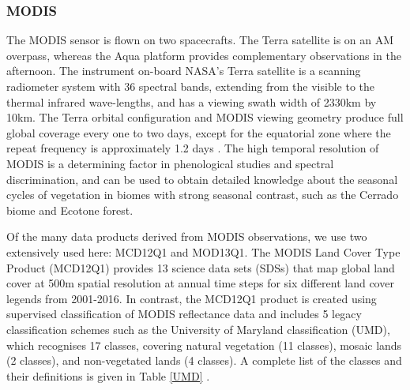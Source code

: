 \subsubsection{MODIS}


The MODIS sensor is flown on two spacecrafts. The Terra satellite is on an AM overpass, whereas the Aqua platform provides complementary observations in the afternoon. The instrument on-board NASA’s Terra satellite is a scanning radiometer system with 36 spectral bands, extending from the visible to the thermal infrared wave-lengths, and has a viewing swath width of 2330km by 10km. The Terra orbital configuration and MODIS viewing geometry produce full global coverage every one to two days, except for the equatorial zone where the repeat frequency is approximately 1.2 days \citep{zhan_2002, setiawan_2014}. The high temporal resolution of MODIS is a determining factor in phenological studies and spectral discrimination, and can be used to obtain detailed knowledge about the seasonal cycles of vegetation in biomes with strong seasonal contrast, such as the Cerrado biome and Ecotone forest. 




Of the many data products derived from MODIS observations, we use two extensively used here: MCD12Q1 and MOD13Q1. The MODIS Land Cover Type Product (MCD12Q1) provides 13 science data sets (SDSs) that map global land cover at 500m spatial resolution at annual time steps for six different land cover legends from 2001-2016. In contrast, the MCD12Q1 product is created using supervised classification of MODIS reflectance data and includes 5 legacy classification schemes such as the University of Maryland classification (UMD), which recognises 17 classes, covering natural vegetation (11 classes), mosaic lands (2 classes), and non-vegetated lands (4 classes). A complete list of the classes and their definitions is given in Table \ref{UMD} \citep{setiawan_2014, friedl_2018}.


